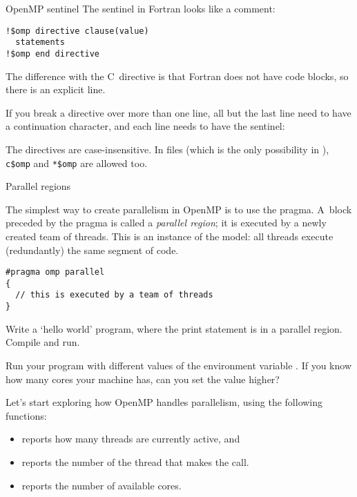 \begin{fortrannote}{OpenMP sentinel}
The sentinel in Fortran looks like a comment:
\begin{lstlisting}
!$omp directive clause(value)
  statements
!$omp end directive
\end{lstlisting}
The difference with the C~directive is that
Fortran does not have code blocks, so there is an explicit
 line.

If you break a directive over more than one line, all but the last line
need to have a continuation character, and each line needs to have the sentinel:
%

The directives are case-insensitive.
In
 files
(which is the only possibility in ),
\verb+c$omp+ and \verb+*$omp+ are allowed too.
\end{fortrannote}


 {Parallel regions}

The simplest way to create parallelism in OpenMP is to use
the  pragma.
A~block preceded by the  pragma
is called a \emph{parallel region}; it
is executed by a newly created team of threads. 
This is an instance of the  model:
all threads execute (redundantly) the same segment of code.
\begin{lstlisting}
#pragma omp parallel
{
  // this is executed by a team of threads
}
\end{lstlisting}

\begin{exercise}
  \label{ex:omp-helloworld}
  Write a `hello world' program, where the
  print statement is in a parallel region.
  Compile and run.

  Run your program with different values of the environment variable
  .
  If you know how many cores your machine has,
  can you set the value higher?
\end{exercise}

Let's start exploring how OpenMP handles parallelism,
using the following functions:
\begin{itemize}
\item {} reports how many threads are
  currently active, and
\item {} reports the number of the
  thread that makes the call.
\item {} reports the number of available
  cores.
\end{itemize}

